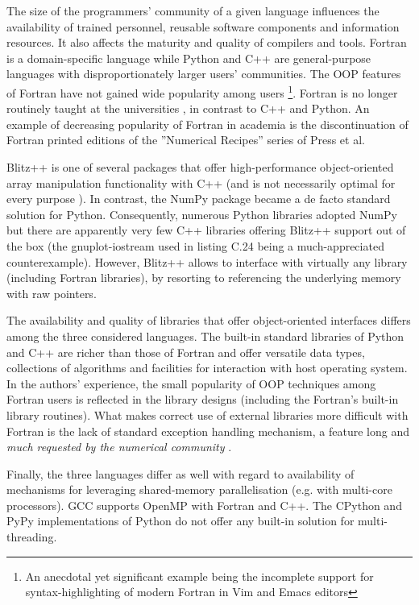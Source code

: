 \documentclass[gmd]{copernicus}%
\begin{document}
  The size of the programmers' community of a given language 
    influences the availability of trained personnel, 
    reusable software components and information resources.
  It also affects the maturity and quality of compilers and tools. 
  Fortran is a domain-specific language while Python and C++ are general-purpose languages
    with disproportionately larger users' communities.
  The OOP features of Fortran have not gained
    wide popularity among users \citep{Worth_2008}\footnote{An anecdotal yet significant
    example being the incomplete support for syntax-highlighting of modern Fortran in Vim and Emacs editors}.
  Fortran is no longer routinely taught at the universities \citep{Kendall_et_al_2008},
    in contrast to C++ and Python.
  An example of decreasing popularity of Fortran in academia 
    is the discontinuation of Fortran printed editions of the ''Numerical Recipes'' 
    series of Press et al.
 
  Blitz++ is one of several packages that offer high-performance object-oriented
    array manipulation functionality with C++ (and is not necessarily optimal for every
    purpose \citep{Iglberger_et_al_2012}).
  In contrast, the NumPy package became a de facto standard solution for Python.
  Consequently, numerous Python libraries adopted NumPy but
    there are apparently very few C++ libraries offering Blitz++ support out of the box
    (the gnuplot-iostream used in listing C.24 being a much-appreciated counterexample).
  However, Blitz++ allows to interface with virtually any library (including Fortran libraries), 
    by resorting to referencing the underlying memory with raw pointers.
 
  The availability and quality of libraries 
    that offer object-oriented interfaces
    differs among the three considered languages.
  The built-in standard libraries of Python and C++ are richer than
    those of Fortran and offer versatile data types, collections of
    algorithms and facilities for interaction with host operating system.
  In the authors' experience, the small popularity of OOP techniques among
    Fortran users is reflected in the library designs (including the Fortran's
    built-in library routines).
  What makes correct use of external libraries more difficult with Fortran
    is the lack of standard exception handling mechanism, a feature
    long and {\em much requested by the numerical community} \citep[][Foreword]{Press_et_al_1996}.

  Finally, the three languages differ as well with regard to availability of 
    mechanisms for leveraging shared-memory parallelisation (e.g. with multi-core processors).
  GCC supports OpenMP with Fortran and C++.
  The CPython and PyPy implementations of Python do not offer any
    built-in solution for multi-threading. 
  
\end{document}
